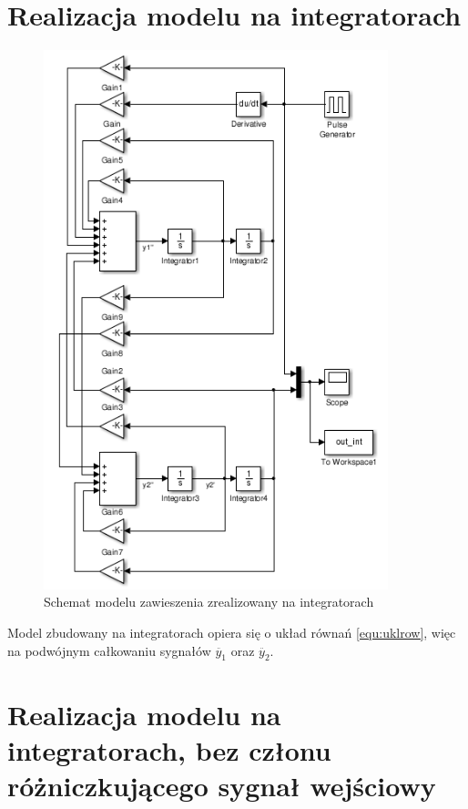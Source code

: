 \documentclass[12pt]{article}
\begin{document}
\newpage

\section{Realizacja modelu na integratorach}

\begin{figure}[!htb]
	\begin{center}
		\includegraphics[width=10cm]{../res/img/integ.png}
	\end{center}
	\caption{Schemat modelu zawieszenia zrealizowany na integratorach}
	\label{rys:schd}
\end{figure}

Model zbudowany na integratorach opiera się o układ równań \eqref{equ:uklrow},
więc na podwójnym całkowaniu sygnałów $\ddot{y_1}$ oraz $\ddot{y_2}$.

\newpage

\section{Realizacja modelu na integratorach, bez członu różniczkującego sygnał
wejściowy}
\end{document}
